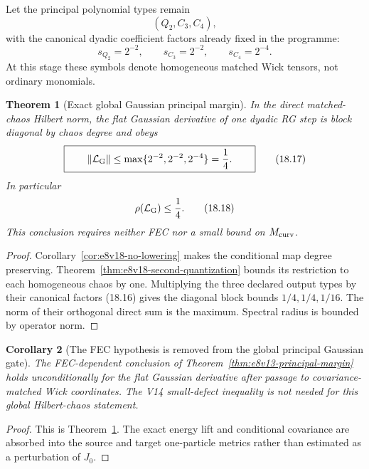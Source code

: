 \documentclass[11pt,oneside]{book}
\newtheorem{theorem}{Theorem}[chapter]
\newtheorem{corollary}[theorem]{Corollary}
\theoremstyle{definition}
\theoremstyle{remark}
\begin{document}
Let the principal polynomial types remain
\[
                         (Q_2,C_3,C_4),                            \tag{18.15}
\]
with the canonical dyadic coefficient factors already fixed in the
programme:
\[
                 s_{Q_2}=2^{-2},\qquad
                 s_{C_3}=2^{-2},\qquad
                 s_{C_4}=2^{-4}.                                  \tag{18.16}
\]
At this stage these symbols denote homogeneous matched Wick tensors,
not ordinary monomials.

\begin{theorem}[Exact global Gaussian principal margin]
\label{thm:e8v18-principal}
In the direct matched-chaos Hilbert norm, the flat Gaussian derivative
of one dyadic RG step is block diagonal by chaos degree and obeys
\[
\boxed{\qquad
 \|\mathcal L_{\rm G}\|
 \leq\max\{2^{-2},2^{-2},2^{-4}\}
 =\frac14.
\qquad}                                                           \tag{18.17}
\]
In particular
\[
                       \rho(\mathcal L_{\rm G})\leq\frac14.         \tag{18.18}
\]
This conclusion requires neither FEC nor a small bound on
\(M_{\rm curv}\).
\end{theorem}

\begin{proof}
Corollary~\ref{cor:e8v18-no-lowering} makes the conditional map
degree preserving.  Theorem~\ref{thm:e8v18-second-quantization}
bounds its restriction to each homogeneous chaos by one.  Multiplying
the three declared output types by their canonical factors (18.16)
gives the diagonal block bounds \(1/4,1/4,1/16\).  The norm of their
orthogonal direct sum is the maximum.  Spectral radius is bounded by
operator norm.
\end{proof}

\begin{corollary}[The FEC hypothesis is removed from the global
principal Gaussian gate]
\label{cor:e8v18-fec-removed}
The FEC-dependent conclusion of
Theorem~\ref{thm:e8v13-principal-margin} holds unconditionally for the
flat Gaussian derivative after passage to covariance-matched Wick
coordinates.  The V14 small-defect inequality is not needed for this
global Hilbert-chaos statement.
\end{corollary}

\begin{proof}
This is Theorem~\ref{thm:e8v18-principal}.  The exact energy lift and
conditional covariance are absorbed into the source and target
one-particle metrics rather than estimated as a perturbation of
\(J_0\).
\end{proof}
\end{document}
